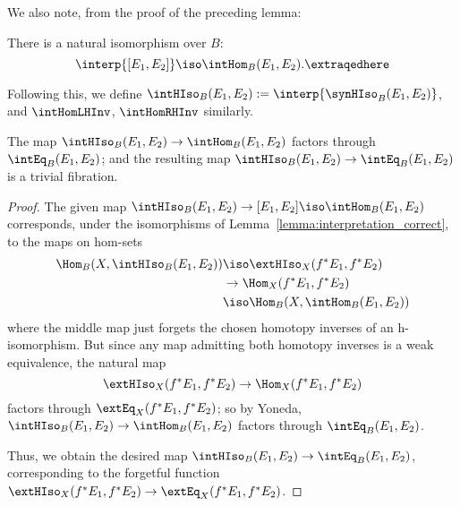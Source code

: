 We also note, from the proof of the preceding lemma:
\begin{corollary}
There is a natural isomorphism over $B$:
\[\interp{ [E_1,E_2] } \iso \intHom_B(E_1,E_2). \extraqedhere \]
\end{corollary}

Following this, we define $\intHIso_B(E_1,E_2) := \interp{ \synHIso_B(E_1,E_2) }$, and $\intHomLHInv$, $\intHomRHInv$ similarly.

\begin{lemma} \label{lemma:hiso-over-eq}
The map $ \intHIso_B(E_1,E_2) \to \intHom_B(E_1,E_2)$ factors through $\intEq_B(E_1,E_2)$; and the resulting map $ \intHIso_B(E_1,E_2) \to \intEq_B(E_1,E_2)$ is a trivial fibration.
\end{lemma}

\begin{proof}
The given map  $ \intHIso_B(E_1,E_2) \to [E_1,E_2] \iso \intHom_B(E_1,E_2)$ corresponds, under the isomorphisms of Lemma~\ref{lemma:interpretation_correct}, to the maps on hom-sets
\begin{equation}
\begin{split}
\Hom_B (X, \intHIso_B (E_1, E_2)) & \iso \extHIso_X (f^*E_1, f^*E_2) \\
& \to \Hom_X (f^*E_1, f^*E_2) \\
& \iso \Hom_B (X, \intHom_B(E_1, E_2)) 
\end{split}
\end{equation}
where the middle map just forgets the chosen homotopy inverses of an h-isomorphism.  But since any map admitting both homotopy inverses is a weak equivalence, the natural map
\[\extHIso_X (f^*E_1, f^*E_2) \to \Hom_X (f^*E_1, f^*E_2)\]
factors through $\extEq_X (f^*E_1, f^*E_2)$; so by Yoneda, $\intHIso_B(E_1,E_2) \to \intHom_B(E_1,E_2)$ factors through $\intEq_B(E_1,E_2)$.
 
Thus, we obtain the desired map $\intHIso_B(E_1, E_2) \to \intEq_B (E_1, E_2)$, corresponding to the forgetful function $\extHIso_X (f^*E_1, f^*E_2) \to \extEq_X (f^*E_1, f^*E_2)$.


\end{proof}
